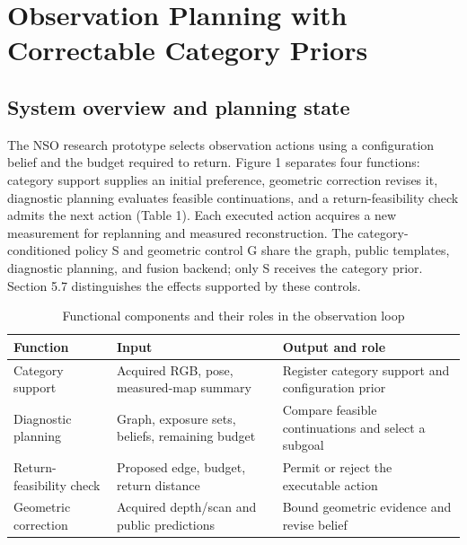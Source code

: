 \documentclass[11pt,a4paper]{article}
\providecommand{\hypertarget}[2]{#2}
\newlength{\JournalTableWidth}
\begin{document}
\hypertarget{observation-planning-with-correctable-category-priors}{%
\section{Observation Planning with Correctable Category Priors}\label{observation-planning-with-correctable-category-priors}}

\hypertarget{system-overview-and-planning-state}{%
\subsection{System overview and planning state}\label{system-overview-and-planning-state}}

The NSO research prototype selects observation actions using a configuration belief and the budget required to return. Figure 1 separates four functions: category support supplies an initial preference, geometric correction revises it, diagnostic planning evaluates feasible continuations, and a return-feasibility check admits the next action (Table 1). Each executed action acquires a new measurement for replanning and measured reconstruction. The category-conditioned policy S and geometric control G share the graph, public templates, diagnostic planning, and fusion backend; only S receives the category prior. Section 5.7 distinguishes the effects supported by these controls.

\begin{table}[!htbp]
\caption{Functional components and their roles in the observation loop}\label{tab:1}
\small\renewcommand{\arraystretch}{1.12}\setlength{\tabcolsep}{3pt}
\setlength{\JournalTableWidth}{\dimexpr\linewidth-4\tabcolsep\relax}
\begin{tabular}{@{}>{\raggedright\arraybackslash}p{0.16\JournalTableWidth} >{\raggedright\arraybackslash}p{0.32\JournalTableWidth} >{\raggedright\arraybackslash}p{0.52\JournalTableWidth}@{}}
\toprule
Function & Input & Output and role \\
\midrule
Category support & Acquired RGB, pose, measured-map summary & Register category support and configuration prior \\
Diagnostic planning & Graph, exposure sets, beliefs, remaining budget & Compare feasible continuations and select a subgoal \\
Return-feasibility check & Proposed edge, budget, return distance & Permit or reject the executable action \\
Geometric correction & Acquired depth/scan and public predictions & Bound geometric evidence and revise belief \\
\bottomrule
\end{tabular}
\end{table}
\end{document}
